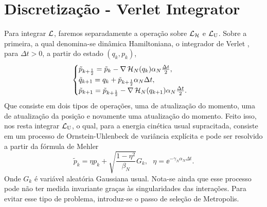 \section{Discretização - Verlet Integrator}

Para integrar $\operatorname{\mathcal{L}}$, faremos separadamente a operação sobre $\operatorname{\mathcal{L}}_{\operatorname{\mathcal{H}}}$ e $\operatorname{\mathcal{L}}_{\operatorname{U}}$. Sobre a primeira, a qual denomina-se dinâmica Hamiltoniana, o integrador de Verlet \cite{Chafa2018}\cite{leimmolecular}, para $\Delta t > 0$, a partir do estado $(q_k, p_k)$,
\begin{equation}
\begin{cases}
	\tilde{p}_{k+\frac{1}{2}} = \tilde{p}_k - \nabla \operatorname{\mathcal{H}}_N(q_k) \alpha_N \frac{\Delta t}{2}, \\
	\tilde{q}_{k+1} = q_k + \tilde{p}_{k + \frac{1}{2}} \alpha_N \Delta t, \\
	\tilde{p}_{k+1} = \tilde{p}_{k+\frac{1}{2}} - \nabla \operatorname{\mathcal{H}}_N(q_{k+1}) \alpha_N \frac{\Delta t}{2}.
\end{cases}
\label{Equation: Verlet}
\end{equation}
Que consiste em dois tipos de operações, uma de atualização do momento, uma de atualização da posição e novamente uma atualização do momento. Feito isso, nos resta integrar $\operatorname{\mathcal{L}}_{\operatorname{U}}$, o qual, para a energia cinética usual supracitada, consiste em um processo de Ornstein-Uhlenbeck de variância explícita e pode ser resolvido a partir da fórmula de Mehler
\begin{equation}
\tilde{p}_k = \eta p_k + \sqrt{\frac{1-\eta^2}{\beta_N}} G_k, \ \ \ \eta = \ee^{-\gamma_N \alpha_N \Delta t}.
\label{Equation: Mehler}
\end{equation}
Onde $G_k$ é variável aleatória Gaussiana usual. Nota-se ainda que esse processo pode não ter medida invariante graças às singularidades das interações. Para evitar esse tipo de problema, introduz-se o passo de seleção de Metropolis.

